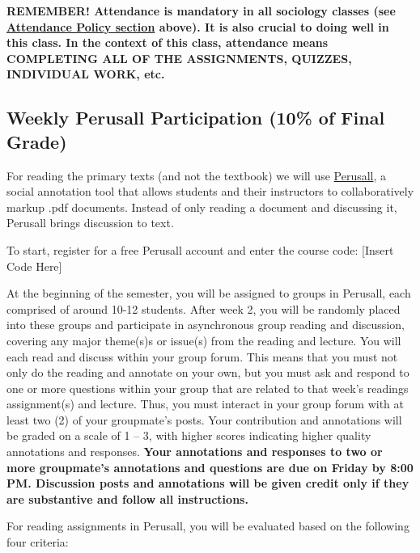 \documentclass[11pt,]{article}
\begin{document}
\textbf{REMEMBER! Attendance is mandatory in all sociology classes (see
\protect\hyperlink{attendance}{Attendance Policy section} above). It is
also crucial to doing well in this class. In the context of this class,
attendance means COMPLETING ALL OF THE ASSIGNMENTS, QUIZZES, INDIVIDUAL
WORK, etc.}

\hypertarget{weekly-perusall-participation-10-of-final-grade}{%
\subsection{Weekly Perusall Participation (10\% of Final
Grade)}\label{weekly-perusall-participation-10-of-final-grade}}

For reading the primary texts (and not the textbook) we will use
\href{https://support.perusall.com/hc/en-us}{Perusall}, a social
annotation tool that allows students and their instructors to
collaboratively markup .pdf documents. Instead of only reading a
document and discussing it, Perusall brings discussion to text.

To start, register for a free Perusall account and enter the course
code: {[}Insert Code Here{]}

At the beginning of the semester, you will be assigned to groups in
Perusall, each comprised of around 10-12 students. After week 2, you
will be randomly placed into these groups and participate in
asynchronous group reading and discussion, covering any major theme(s)s
or issue(s) from the reading and lecture. You will each read and discuss
within your group forum. This means that you must not only do the
reading and annotate on your own, but you must ask and respond to one or
more questions within your group that are related to that week's
readings assignment(s) and lecture. Thus, you must interact in your
group forum with at least two (2) of your groupmate's posts. Your
contribution and annotations will be graded on a scale of 1 -- 3, with
higher scores indicating higher quality annotations and responses.
\textbf{Your annotations and responses to two or more groupmate's
annotations and questions are due on Friday by 8:00 PM. Discussion posts
and annotations will be given credit only if they are substantive and
follow all instructions.}

For reading assignments in Perusall, you will be evaluated based on the
following four criteria:
\end{document}
